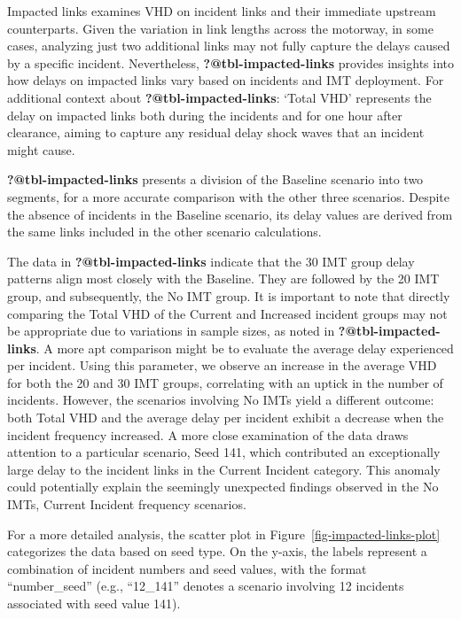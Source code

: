 \documentclass[fancy, oneside, mastersfancy, ms]{byuthesis}
\begin{document}
Impacted links examines VHD on incident links and their immediate
upstream counterparts. Given the variation in link lengths across the
motorway, in some cases, analyzing just two additional links may not
fully capture the delays caused by a specific incident. Nevertheless,
\textbf{?@tbl-impacted-links} provides insights into how delays on
impacted links vary based on incidents and IMT deployment. For
additional context about \textbf{?@tbl-impacted-links}: `Total VHD'
represents the delay on impacted links both during the incidents and for
one hour after clearance, aiming to capture any residual delay shock
waves that an incident might cause.

\textbf{?@tbl-impacted-links} presents a division of the Baseline
scenario into two segments, for a more accurate comparison with the
other three scenarios. Despite the absence of incidents in the Baseline
scenario, its delay values are derived from the same links included in
the other scenario calculations.

The data in \textbf{?@tbl-impacted-links} indicate that the 30 IMT group
delay patterns align most closely with the Baseline. They are followed
by the 20 IMT group, and subsequently, the No IMT group. It is important
to note that directly comparing the Total VHD of the Current and
Increased incident groups may not be appropriate due to variations in
sample sizes, as noted in \textbf{?@tbl-impacted-links}. A more apt
comparison might be to evaluate the average delay experienced per
incident. Using this parameter, we observe an increase in the average
VHD for both the 20 and 30 IMT groups, correlating with an uptick in the
number of incidents. However, the scenarios involving No IMTs yield a
different outcome: both Total VHD and the average delay per incident
exhibit a decrease when the incident frequency increased. A more close
examination of the data draws attention to a particular scenario, Seed
141, which contributed an exceptionally large delay to the incident
links in the Current Incident category. This anomaly could potentially
explain the seemingly unexpected findings observed in the No IMTs,
Current Incident frequency scenarios.

For a more detailed analysis, the scatter plot in
Figure~\ref{fig-impacted-links-plot} categorizes the data based on seed
type. On the y-axis, the labels represent a combination of incident
numbers and seed values, with the format ``number\_seed'' (e.g.,
``12\_141'' denotes a scenario involving 12 incidents associated with
seed value 141).
\end{document}
